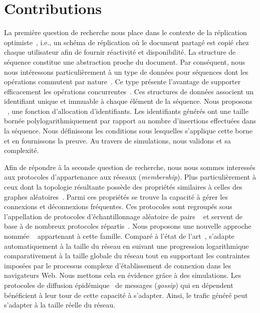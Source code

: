 
\section{Contributions}

La première question de recherche nous place dans le contexte de la réplication
optimiste~\cite{demers1987epidemic, saito2005optimistic}, i.e., un schéma de
réplication où le document partagé est copié chez chaque utilisateur afin de
fournir réactivité et disponibilité. La structure de séquence constitue une
abstraction proche du document. Par conséquent, nous nous intéressons
particulièrement à un type de données pour séquences dont les opérations
commutent par nature~\cite{burckhardt2014replicated, shapiro2011comprehensive,
  shapiro2011conflict, zawirski2015dependable}. Ce type présente l'avantage de
supporter efficacement les opérations concurrentes~\cite{ahmed2015evaluation,
  ahmed2011evaluating}. Ces structures de données associent un identifiant
unique et immuable à chaque élément de la séquence. Nous proposons
\LSEQ~\cite{nedelec2013concurrency, nedelec2013lseq}, une fonction d'allocation
d'identifiants. Les identifiants générés ont une taille bornée
polylogarithmiquement par rapport au nombre d'insertions effectuées dans la
séquence. Nous définissons les conditions sous lesquelles s'applique cette borne
et en fournissons la preuve. Au travers de simulations, nous validons \LSEQ et
sa complexité.

Afin de répondre à la seconde question de recherche, nous nous sommes interessés
aux protocoles d'appartenance aux réseaux (\emph{membership}). Plus
particulièrement à ceux dont la topologie résultante possède des propriétés
similaires à celles des graphes aléatoires~\cite{erdos1959random}. Parmi ces
propriétés se trouve la capacité à gérer les connexions et déconnexions
fréquentes. Ces protocoles sont regroupés sous l'appellation de \og protocoles
d'échantillonnage aléatoire de pairs \fg~\cite{jelasity2004peer,
  jelasity2007gossip} et servent de base à de nombreux protocoles
répartis~\cite{dabek2004vivaldi, folz2016cyclades, montresor2005chord}. Nous
proposons une nouvelle approche nommée \SPRAY~\cite{nedelec2015spray}
appartenant à cette famille. Comparé à l'état de
l'art~\cite{eugster2003lightweight, ganesh2001scamp, jelasity2007gossip,
  leitao2007dependable, tolgyeski2009adaptive, voulgaris2005cyclon}, \SPRAY
s'adapte automatiquement à la taille du réseau en suivant une progression
logarithmique comparativement à la taille globale du réseau tout en supportant
les contraintes imposées par le processus complexe d'établissement de connexion
dans les navigateurs Web. Nous mettons cela en évidence grâce à des simulations.
Les protocoles de diffusion épidémique~\cite{birman1999bimodal} de messages
(\emph{gossip}) qui en dépendent bénéficient à leur tour de cette capacité à
s'adapter. Ainsi, le trafic généré peut s'adapter à la taille réelle du réseau.

